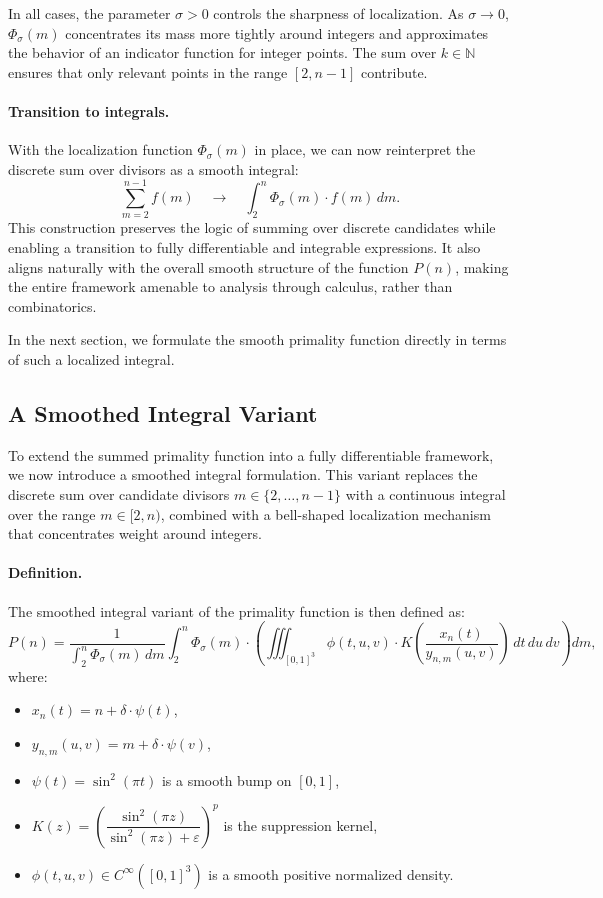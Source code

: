 \documentclass[12pt]{article}
\theoremstyle{definition}
\theoremstyle{plain}
\theoremstyle{remark}
\begin{document}
In all cases, the parameter \( \sigma > 0 \) controls the sharpness of localization. As \( \sigma \to 0 \), \( \Phi_\sigma(m) \) concentrates its mass more tightly around integers and approximates the behavior of an indicator function for integer points. The sum over \( k \in \mathbb{N} \) ensures that only relevant points in the range \( [2, n-1] \) contribute.

\paragraph{Transition to integrals.}  
With the localization function \( \Phi_\sigma(m) \) in place, we can now reinterpret the discrete sum over divisors as a smooth integral:
\[
\sum_{m=2}^{n-1} f(m) \quad \longrightarrow \quad \int_2^n \Phi_\sigma(m) \cdot f(m)\, dm.
\]
This construction preserves the logic of summing over discrete candidates while enabling a transition to fully differentiable and integrable expressions. It also aligns naturally with the overall smooth structure of the function \( P(n) \), making the entire framework amenable to analysis through calculus, rather than combinatorics.

In the next section, we formulate the smooth primality function directly in terms of such a localized integral.

\subsection{A Smoothed Integral Variant}

To extend the summed primality function into a fully differentiable framework, we now introduce a smoothed integral formulation. This variant replaces the discrete sum over candidate divisors \( m \in \{2, \dots, n-1\} \) with a continuous integral over the range \( m \in [2, n) \), combined with a bell-shaped localization mechanism that concentrates weight around integers.

\paragraph{Definition.}

The smoothed integral variant of the primality function is then defined as:
\[
P(n) = \frac{1}{\int_2^n \Phi_\sigma(m)\, dm}
\int_2^n \Phi_\sigma(m) \cdot
\left(
\iiint_{[0,1]^3}
\phi(t,u,v) \cdot
K\left( \frac{x_n(t)}{y_{n,m}(u,v)} \right)
\, dt \, du \, dv
\right) dm,
\]
where:
\begin{itemize}
  \item \( x_n(t) = n + \delta \cdot \psi(t) \),
  \item \( y_{n,m}(u,v) = m + \delta \cdot \psi(v) \),
  \item \( \psi(t) = \sin^2(\pi t) \) is a smooth bump on \([0,1]\),
  \item \( K(z) = \left( \dfrac{\sin^2(\pi z)}{\sin^2(\pi z) + \varepsilon} \right)^p \) is the suppression kernel,
  \item \( \phi(t,u,v) \in C^\infty([0,1]^3) \) is a smooth positive normalized density.
\end{itemize}
\end{document}
